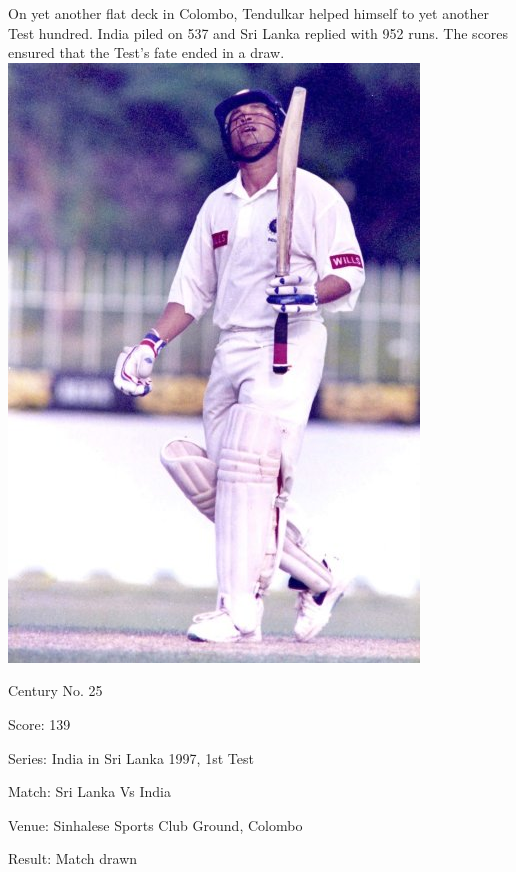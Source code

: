 \documentclass[11pt, a4paper]{article}
\begin{document}
On yet another flat deck in Colombo, Tendulkar helped himself to yet another Test hundred. India piled on 537 and Sri Lanka replied with 952 runs. The scores ensured that the Test's fate ended in a draw.
\newpage
\includegraphics[height=0.8\textheight]{pics/25.jpg}

Century No. 25

Score: 139

Series: India in Sri Lanka 1997, 1st Test

Match: Sri Lanka Vs India

Venue: Sinhalese Sports Club Ground, Colombo

Result: Match drawn
\end{document}
